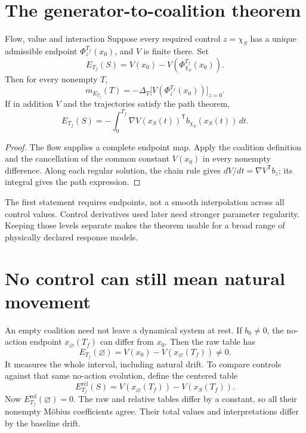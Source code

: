 \section{The generator-to-coalition theorem}
\begin{theorem}{Flow, value and interaction}\label{thm:flow-mobius}
Suppose every required control $z=\chi_S$ has a unique admissible endpoint $\Phi_z^{T_f}(x_0)$, and $V$ is finite there. Set
\begin{equation}
 E_{T_f}(S)=V(x_0)-V(\Phi_{\chi_S}^{T_f}(x_0)).
\end{equation}
Then for every nonempty $T$,
\begin{equation}\label{eq:flow-mobius}
 m_{E_{T_f}}(T)=-\Delta_T\bigl[V(\Phi_z^{T_f}(x_0))\bigr]_{z=0}.
\end{equation}
If in addition $V$ and the trajectories satisfy the path theorem,
\begin{equation}\label{eq:flow-path}
 E_{T_f}(S)=-\int_0^{T_f}
 \nabla V(x_S(t))^{\mathsf T}b_{\chi_S}(x_S(t))\,dt.
\end{equation}
\end{theorem}
\begin{proof}
The flow supplies a complete endpoint map. Apply the coalition definition and the cancellation of the common constant $V(x_0)$ in every nonempty difference. Along each regular solution, the chain rule gives $dV/dt=\nabla V^{\mathsf T}b_z$; its integral gives the path expression.
\end{proof}

The first statement requires endpoints, not a smooth interpolation across all control values. Control derivatives used later need stronger parameter regularity. Keeping those levels separate makes the theorem usable for a broad range of physically declared response models.

\section{No control can still mean natural movement}
An empty coalition need not leave a dynamical system at rest. If $b_0\ne0$, the no-action endpoint $x_\varnothing({T_f})$ can differ from $x_0$. Then the raw table has
\begin{equation}
 E_{T_f}(\varnothing)=V(x_0)-V(x_\varnothing({T_f}))\ne0.
\end{equation}
It measures the whole interval, including natural drift. To compare controls against that same no-action evolution, define the centered table
\begin{equation}\label{eq:drift-centered}
 E_{T_f}^{\mathrm{rel}}(S)=V(x_\varnothing({T_f}))-V(x_S({T_f})).
\end{equation}
Now $E_{T_f}^{\mathrm{rel}}(\varnothing)=0$. The raw and relative tables differ by a constant, so all their nonempty Möbius coefficients agree. Their total values and interpretations differ by the baseline drift.

